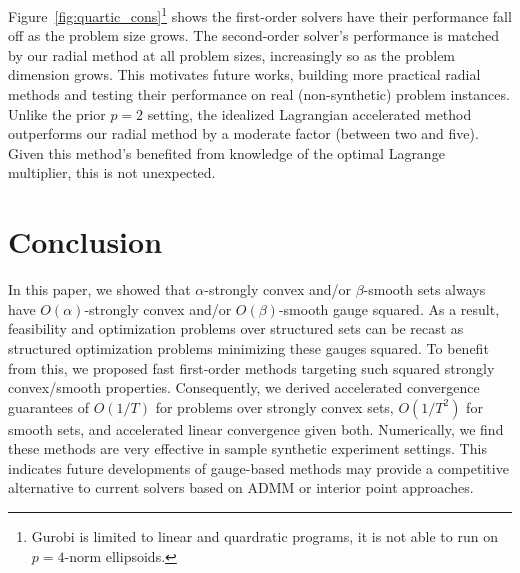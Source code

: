 \documentclass[sn-mathphys,Numbered]{sn-jnl}%
\begin{document}

Figure~\ref{fig:quartic_cons}\footnote{Gurobi is limited to linear and quardratic programs, it is not able to run on $p=4$-norm ellipsoids.} shows the first-order solvers have their performance fall off as the problem size grows.  The second-order solver's performance is matched by our radial method at all problem sizes, increasingly so as the problem dimension grows. This motivates future works, building more practical radial methods and testing their performance on real (non-synthetic) problem instances. Unlike the prior $p=2$ setting, the idealized Lagrangian accelerated method outperforms our radial method by a moderate factor (between two and five). Given this method's benefited from knowledge of the optimal Lagrange multiplier, this is not unexpected.


\section{Conclusion} \label{sec:concl}

In this paper, we showed that $\alpha$-strongly convex and/or $\beta$-smooth sets always have $O(\alpha)$-strongly convex and/or $O(\beta)$-smooth gauge squared. As a result, feasibility and optimization problems over structured sets can be recast as structured optimization problems minimizing these gauges squared. To benefit from this, we proposed fast first-order methods targeting such squared strongly convex/smooth properties. Consequently, we derived accelerated convergence guarantees of $O(1/T)$ for problems over strongly convex sets, $O(1/T^2)$ for smooth sets, and accelerated linear convergence given both.
Numerically, we find these methods are very effective in sample synthetic experiment settings. This indicates future developments of gauge-based methods may provide a competitive alternative to current solvers based on ADMM or interior point approaches.
\end{document}
